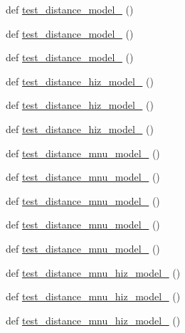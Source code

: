\begin{DoxyCompactItemize}
\item 
def \mbox{\hyperlink{namespaceccl__test__distances_aa017368b7bb80486c629854c912ba8c5}{test\+\_\+distance\+\_\+model\+\_}} ()
\item 
def \mbox{\hyperlink{namespaceccl__test__distances_ab745ddf53273403ccc7739ea7de4aba0}{test\+\_\+distance\+\_\+model\+\_}} ()
\item 
def \mbox{\hyperlink{namespaceccl__test__distances_a0569d89c95e633be4fae7644dee28541}{test\+\_\+distance\+\_\+model\+\_}} ()
\item 
def \mbox{\hyperlink{namespaceccl__test__distances_ad363cc38cdd3a8c2ef59161c5e163eb2}{test\+\_\+distance\+\_\+hiz\+\_\+model\+\_}} ()
\item 
def \mbox{\hyperlink{namespaceccl__test__distances_a55d3eaf66d13907ac22f589ed5c00919}{test\+\_\+distance\+\_\+hiz\+\_\+model\+\_}} ()
\item 
def \mbox{\hyperlink{namespaceccl__test__distances_aa07f859291800c156d3aba2ed8d0a49c}{test\+\_\+distance\+\_\+hiz\+\_\+model\+\_}} ()
\item 
def \mbox{\hyperlink{namespaceccl__test__distances_a2d83223c852c312a2098e9f9876e5e57}{test\+\_\+distance\+\_\+mnu\+\_\+model\+\_}} ()
\item 
def \mbox{\hyperlink{namespaceccl__test__distances_a96e0d6a13d048cf146a8a3bbbd79be84}{test\+\_\+distance\+\_\+mnu\+\_\+model\+\_}} ()
\item 
def \mbox{\hyperlink{namespaceccl__test__distances_a1b20f3421e9073c5a7f3bdbe34b799fa}{test\+\_\+distance\+\_\+mnu\+\_\+model\+\_}} ()
\item 
def \mbox{\hyperlink{namespaceccl__test__distances_a61ce1172f657410eec34707c121a9a19}{test\+\_\+distance\+\_\+mnu\+\_\+model\+\_}} ()
\item 
def \mbox{\hyperlink{namespaceccl__test__distances_aaa1d41cfec1083235cccae3beafe29a3}{test\+\_\+distance\+\_\+mnu\+\_\+model\+\_}} ()
\item 
def \mbox{\hyperlink{namespaceccl__test__distances_a811e73687fff88ef10c3491a1b6f68d8}{test\+\_\+distance\+\_\+mnu\+\_\+hiz\+\_\+model\+\_}} ()
\item 
def \mbox{\hyperlink{namespaceccl__test__distances_a5e35139a35d41e0c1c27dc99ebe6e075}{test\+\_\+distance\+\_\+mnu\+\_\+hiz\+\_\+model\+\_}} ()
\item 
def \mbox{\hyperlink{namespaceccl__test__distances_a3d7c4d84ee0ddeec416d6aa8bd01b5c3}{test\+\_\+distance\+\_\+mnu\+\_\+hiz\+\_\+model\+\_}} ()
\item 

\end{DoxyCompactItemize}
